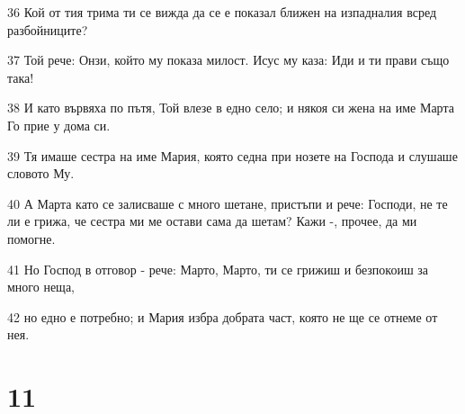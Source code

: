 \par 36 Кой от тия трима ти се вижда да се е показал ближен на изпадналия всред разбойниците?
\par 37 Той рече: Онзи, който му показа милост. Исус му каза: Иди и ти прави също така!
\par 38 И като вървяха по пътя, Той влезе в едно село; и някоя си жена на име Марта Го прие у дома си.
\par 39 Тя имаше сестра на име Мария, която седна при нозете на Господа и слушаше словото Му.
\par 40 А Марта като се залисваше с много шетане, пристъпи и рече: Господи, не те ли е грижа, че сестра ми ме остави сама да шетам? Кажи -, прочее, да ми помогне.
\par 41 Но Господ в отговор - рече: Марто, Марто, ти се грижиш и безпокоиш за много неща,
\par 42 но едно е потребно; и Мария избра добрата част, която не ще се отнеме от нея.

\chapter{11}

